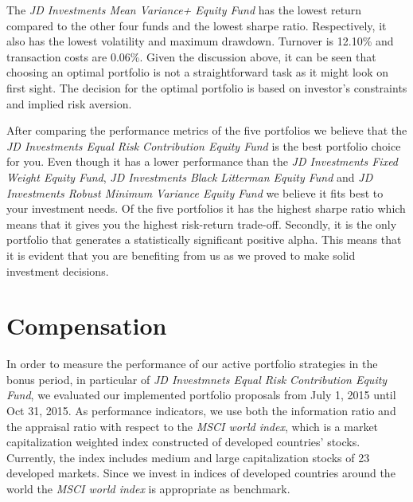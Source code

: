 \documentclass[11pt, parskip=full, DIV=14, headings=small, footsepline, footinclude=false, headsepline]{scrreprt}
\begin{document}
The \textit{JD Investments Mean Variance+ Equity Fund} has the lowest return compared to the other four funds and the lowest sharpe ratio. Respectively, it also has the lowest volatility and maximum drawdown. Turnover is 12.10\% and transaction costs are 0.06\%. Given the discussion above, it can be seen that choosing an optimal portfolio is not a straightforward task as it might look on first sight. The decision for the optimal portfolio is based on investor’s constraints and implied risk aversion. 

After comparing the performance metrics of the five portfolios we believe that the \textit{JD Investments Equal Risk Contribution Equity Fund} is the best portfolio choice for you. Even though it has a lower performance than the \textit{JD Investments Fixed Weight Equity Fund}, \textit{JD Investments Black Litterman Equity Fund} and \textit{JD Investments Robust Minimum Variance Equity Fund} we believe it fits best to your investment needs. Of the five portfolios it has the highest sharpe ratio which means that it gives you the highest risk-return trade-off. Secondly, it is the only portfolio that generates a statistically significant positive alpha. This means that it is evident that you are benefiting from us as we proved to make solid investment decisions.

\chapter{Compensation}
In order to measure the performance of our active portfolio strategies in the bonus period, in particular of \textit{JD Investmnets Equal Risk Contribution Equity Fund}, we evaluated our implemented portfolio proposals from July 1, 2015 until Oct 31, 2015. As performance indicators, we use both the information ratio and the appraisal ratio with respect to the \textit{MSCI world index}, which is a market capitalization weighted index constructed of developed countries’ stocks. Currently, the index includes medium and large capitalization stocks of 23 developed markets. Since we invest in indices of developed countries around the world the \textit{MSCI world index} is appropriate as benchmark. 
\end{document}
